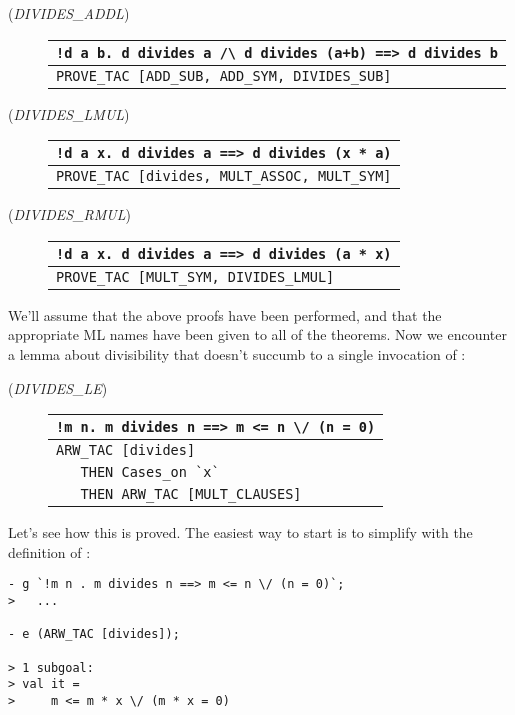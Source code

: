 \begin{description}
\item[\small{({\it DIVIDES\_ADDL\/})}]
\begin{tabular}[t]{l}
\verb|!d a b. d divides a /\ d divides (a+b) ==> d divides b| \\ \hline
 \verb+PROVE_TAC [ADD_SUB, ADD_SYM, DIVIDES_SUB]+ \\
\end{tabular}

\item[\small{({\it DIVIDES\_LMUL\/})}]
\begin{tabular}[t]{l}
\verb+!d a x. d divides a ==> d divides (x * a)+ \\ \hline
 \verb+PROVE_TAC [divides, MULT_ASSOC, MULT_SYM]+ \\
\end{tabular}

\item[\small{({\it DIVIDES\_RMUL\/})}]
\begin{tabular}[t]{l}
\verb+!d a x. d divides a ==> d divides (a * x)+ \\ \hline
 \verb+PROVE_TAC [MULT_SYM, DIVIDES_LMUL]+ \\
\end{tabular}

\end{description}

\noindent We'll assume that the above proofs have been performed, and
that the appropriate ML names have been given to all of the theorems.
Now we encounter a lemma about divisibility that doesn't succumb to a
single invocation of :
\begin{description}
\item [\small{({\it DIVIDES\_LE\/})}]
\begin{tabular}[t]{l}
\verb+!m n. m divides n ==> m <= n \/ (n = 0)+ \\ \hline
\verb+ARW_TAC [divides]+ \\
\verb+   THEN Cases_on `x`+ \\
\verb+   THEN ARW_TAC [MULT_CLAUSES]+ \\
\end{tabular}
\end{description}
Let's see how this is proved. The easiest way to start is to simplify
with the definition of :
\begin{session}\begin{verbatim}
- g `!m n . m divides n ==> m <= n \/ (n = 0)`;
>   ...

- e (ARW_TAC [divides]);

> 1 subgoal:
> val it =
>     m <= m * x \/ (m * x = 0)
\end{verbatim}\end{session}

